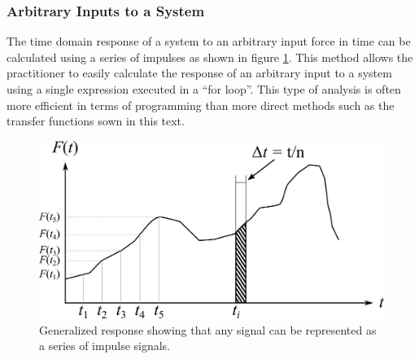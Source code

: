 \documentclass[12pt,letter]{article}
\numberwithin{ex}{section} %
\numberwithin{re}{section} %
\numberwithin{equation}{section}	%
\begin{document}
\subsubsection{Arbitrary Inputs to a System}
\label{sec:impulse_inputs}
The time domain response of a system to an arbitrary input force in time can be calculated using a series of impulses as shown in figure \ref{fig:Arbitary_excitation_forces}. This method allows the practitioner to easily calculate the response of an arbitrary input to a system using a single expression executed in a ``for loop''. This type of analysis is often more efficient in terms of programming than more direct methods such as the transfer functions sown in this text. 

\begin{figure}[H]
	\centering
	\includegraphics[]{../figures/Arbitary_excitation_forces.png}
	\caption{Generalized response showing that any signal can be represented as a series of impulse signals. }
	\label{fig:Arbitary_excitation_forces}
\end{figure}
\end{document}
